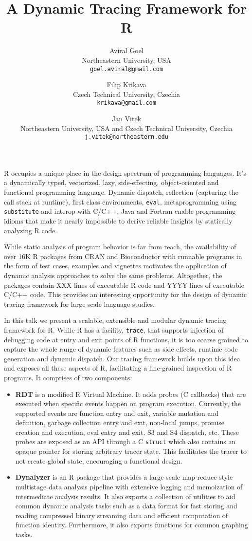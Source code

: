 \documentclass{article}
\title{A Dynamic Tracing Framework for R}
\author{
  Aviral Goel                                                          \\
  Northeastern University, USA                                         \\
  \texttt{goel.aviral@gmail.com}
  \and
  Filip Krikava                                                        \\
  Czech Technical University, Czechia                                  \\
  \texttt{krikava@gmail.com}
  \and
  Jan Vitek                                                            \\
  Northeastern University, USA and Czech Technical University, Czechia \\
  \texttt{j.vitek@northeastern.edu}}
\date{}
\begin{document}
\maketitle

R occupies a unique place in the design spectrum of programming languages. It’s
a dynamically typed, vectorized, lazy, side-effecting, object-oriented and
functional programming language. Dynamic dispatch, reflection (capturing the
call stack at runtime), first class environments, \texttt{eval}, metaprogramming
using \texttt{substitute} and interop with C/C++, Java and Fortran enable programming
idioms that make it nearly impossible to derive reliable insights by
statically analyzing R code.

While static analysis of program behavior is far from reach, the availability of
over 16K R packages from CRAN and Bioconductor with runnable programs in the
form of test cases, examples and vignettes motivates the application of dynamic
analysis approaches to solve the same problems. Altogether, the packages contain
XXX lines of executable R code and YYYY lines of executable C/C++ code. This
provides an interesting opportunity for the design of dynamic tracing framework
for large scale language studies.

In this talk we present a scalable, extensible and modular dynamic tracing
framework for R. While R has a facility, \texttt{trace}, that supports injection
of debugging code at entry and exit points of R functions, it is too coarse
grained to capture the whole range of dynamic features such as side effects,
runtime code generation and dynamic dispatch. Our tracing framework builds upon
this idea and exposes all these aspects of R, facilitating a fine-grained
inspection of R programs. It comprises of two components:
\begin{itemize}
\item \textbf{RDT} is a modified R Virtual Machine. It adds probes (C callbacks)
  that are executed when specific events happen on program execution. Currently,
  the supported events are function entry and exit, variable mutation and
  definition, garbage collection entry and exit, non-local jumps, promise
  creation and execution, eval entry and exit, S3 and S4 dispatch, etc. These
  probes are exposed as an API through a C \texttt{struct} which also contains
  an opaque pointer for storing arbitrary tracer state. This facilitates the
  tracer to not create global state, encouraging a functional design.
\item \textbf{Dynalyzer} is an R package that provides a large scale map-reduce
  style multistage data analysis pipeline with extensive logging and memoization
  of intermediate analysis results. It also exports a collection of utilities to aid
  common dynamic analysis tasks such as a data format for fast storing and
  reading compressed binary streaming data and efficient computation of function
  identity. Furthermore, it also exports functions for common graphing tasks.
\end{itemize}
\end{document}
